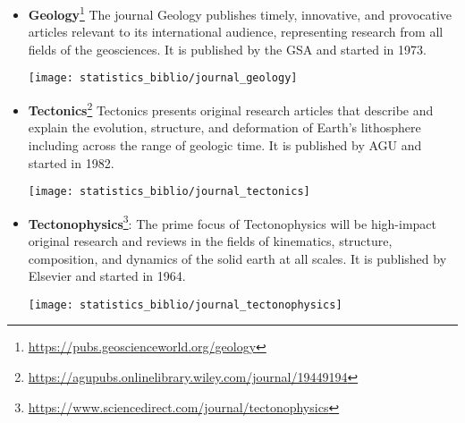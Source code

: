 \begin{itemize}
\item {\bf Geology}\footnote{\url{https://pubs.geoscienceworld.org/geology}}
The journal Geology publishes timely, innovative, and provocative articles relevant 
to its international audience, representing research from all fields of the geosciences.
It is published by the GSA and started in 1973.

\begin{center}
\texttt{[image: statistics\_biblio/journal\_geology]}
\end{center}


\item {\bf Tectonics}\footnote{\url{https://agupubs.onlinelibrary.wiley.com/journal/19449194}}
Tectonics presents original research articles that describe and explain the evolution, 
structure, and deformation of Earth’s lithosphere including across the range of geologic time.
It is published by AGU and started in 1982.

\begin{center}
\texttt{[image: statistics\_biblio/journal\_tectonics]}
\end{center}


\item {\bf Tectonophysics}\footnote{\url{https://www.sciencedirect.com/journal/tectonophysics}}: 
The prime focus of Tectonophysics will be high-impact original research and 
reviews in the fields of kinematics, structure, composition, and dynamics 
of the solid earth at all scales. 
It is published by Elsevier and started in 1964.

\begin{center}
\texttt{[image: statistics\_biblio/journal\_tectonophysics]}
\end{center}

\end{itemize}



